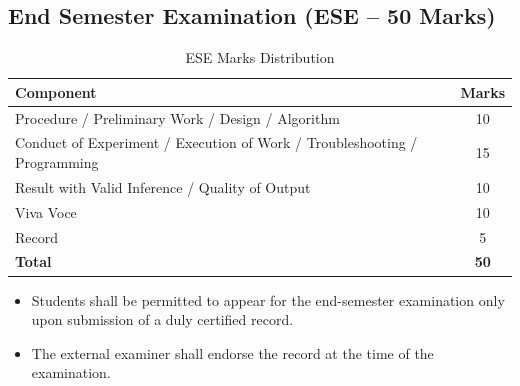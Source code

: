 \subsection*{End Semester Examination (ESE -- 50 Marks)}
\begin{table}[H]
	\centering
	\renewcommand{\arraystretch}{1.3}
	\begin{tabular}{p{9.5cm}c}
		\toprule
		\textbf{Component} & \textbf{Marks} \\
		\midrule
		Procedure / Preliminary Work / Design / Algorithm & 10 \\
		
		Conduct of Experiment / Execution of Work / Troubleshooting / Programming & 15 \\
		
		Result with Valid Inference / Quality of Output & 10 \\
		
		Viva Voce & 10 \\
		
		Record & 5 \\
		\midrule
		\textbf{Total} & \textbf{50} \\
		\bottomrule
	\end{tabular}
	\caption{ESE Marks Distribution}
\end{table}

\begin{itemize}[label=]
	\item Students shall be permitted to appear for the end-semester examination only upon submission of a duly certified record.
	\item The external examiner shall endorse the record at the time of the examination.
\end{itemize}

